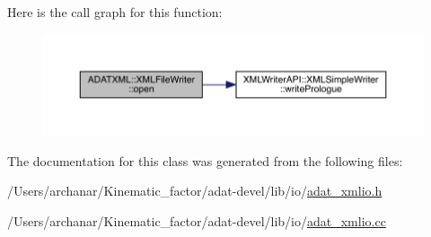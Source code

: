 Here is the call graph for this function\+:
\nopagebreak
\begin{figure}[H]
\begin{center}
\leavevmode
\includegraphics[width=350pt]{d6/ddb/classADATXML_1_1XMLFileWriter_a76f52e7ccdfe3b82875f30953cfd2447_cgraph}
\end{center}
\end{figure}


The documentation for this class was generated from the following files\+:\begin{DoxyCompactItemize}
\item 
/\+Users/archanar/\+Kinematic\+\_\+factor/adat-\/devel/lib/io/\mbox{\hyperlink{adat-devel_2lib_2io_2adat__xmlio_8h}{adat\+\_\+xmlio.\+h}}\item 
/\+Users/archanar/\+Kinematic\+\_\+factor/adat-\/devel/lib/io/\mbox{\hyperlink{adat-devel_2lib_2io_2adat__xmlio_8cc}{adat\+\_\+xmlio.\+cc}}\end{DoxyCompactItemize}
